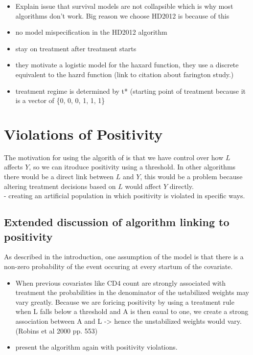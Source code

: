 \documentclass[11pt]{article}
\providecommand{\tightlist}{%
      \setlength{\itemsep}{0pt}\setlength{\parskip}{0pt}}
\begin{document}
\begin{itemize}
\tightlist
\item
  Explain issue that survival models are not collapsible which is why
  most algorithms don't work. Big reason we choose HD2012 is because of
  this
\item
  no model mispecification in the HD2012 algorithm
\item
  stay on treatment after treatment starts
\item
  they motivate a logistic model for the haxard function, they use a
  discrete equivalent to the hazrd function (link to citation about
  farington study.)
\item
  treatment regime is determined by t* (starting point of treatment
  because it is a vector of \{0, 0, 0, 1, 1, 1\}
\end{itemize}

    \section{Violations of Positivity}\label{violations-of-positivity}

The motivation for using the algorith of \citet{Havercroft2012} is that
we have control over how \(L\) affects \(Y\), so we can itroduce
positivity using a threshold. In other algorithms there would be a
direct link between \(L\) and \(Y\), this would be a problem because
altering treatment decisions based on \(L\) would affect \(Y\)
directly.\\
- creating an artificial population in which positivity is violated in
specific ways.

\subsection{Extended discussion of algorithm linking to
positivity}\label{extended-discussion-of-algorithm-linking-to-positivity}

As described in the introduction, one assumption of the model is that
there is a non-zero probability of the event occuring at every startum
of the covariate.

\begin{itemize}
\tightlist
\item
  When previous covariates like CD4 count are strongly associated with
  treatment the probabilities in the denominator of the ustabilized
  weights may vary greatly. Because we are foricing positivity by using
  a treatment rule when L falls below a threshold and A is then eaual to
  one, we create a strong association between A and L -\textgreater{}
  hence the unstabilized weights would vary. (Robins et al 2000 pp. 553)
\item
  present the algorithm again with positivity violations.
\end{itemize}
\end{document}
